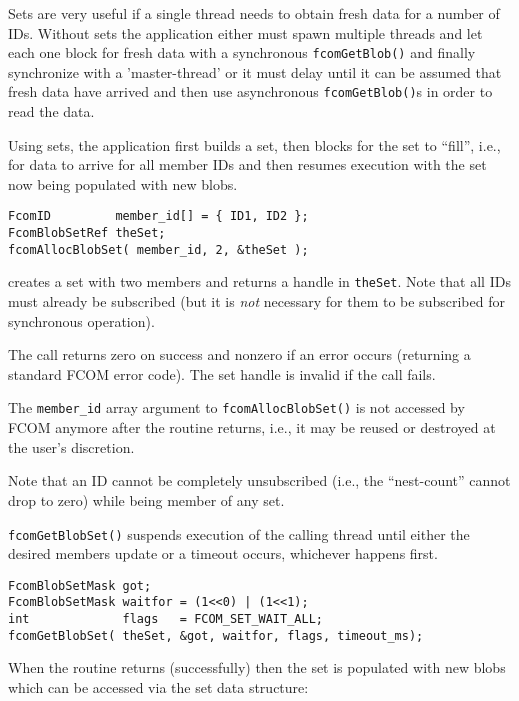 \documentclass[11pt]{article}
\newcommand{\fcom}{FCOM}
\newcommand{\blob}{blob}
\newcommand{\set}{set}
\newcommand{\Set}{Set}
\newcommand{\cstl}[1]{{\lstinline+#1+}}
\begin{document}
      \Set{}s are very useful if a single thread needs to obtain fresh
      data for a number of IDs. Without \set{}s the application either must
      spawn multiple threads and let each one block for fresh data
      with a synchronous \cstl{fcomGetBlob()} and finally synchronize
      with a 'master-thread' or it must delay until it can be assumed
      that fresh data have arrived and then use asynchronous \cstl{fcomGetBlob()}s
      in order to read the data.

      Using \set{}s, the application first builds a \set, then blocks
      for the \set{} to ``fill'', i.e., for data to arrive for all member IDs
      and then resumes execution with the \set{} now being populated with
      new \blob{}s.

      \begin{verbatim}
FcomID         member_id[] = { ID1, ID2 };
FcomBlobSetRef theSet;
fcomAllocBlobSet( member_id, 2, &theSet );
      \end{verbatim}
      creates a \set{} with two members and returns a handle in \cstl{theSet}.
      Note that all IDs must already be subscribed (but it is {\em not} necessary for
      them to be subscribed for synchronous operation).

      The call returns zero on success and nonzero if an error occurs (returning
      a standard \fcom{} error code). The \set{} handle is invalid if the call
      fails.

      The \cstl{member_id} array argument to \cstl{fcomAllocBlobSet()} is
      not accessed by \fcom{} anymore after the routine returns, i.e., it may
      be reused or destroyed at the user's discretion.

      Note that an ID cannot be completely unsubscribed (i.e., the ``nest-count''
      cannot drop to zero) while being member of any \set.

      \cstl{fcomGetBlobSet()} suspends execution of the calling thread until
      either the desired members update or a timeout occurs, whichever happens
      first.

      \begin{verbatim}
FcomBlobSetMask got;
FcomBlobSetMask waitfor = (1<<0) | (1<<1);
int             flags   = FCOM_SET_WAIT_ALL;
fcomGetBlobSet( theSet, &got, waitfor, flags, timeout_ms);
      \end{verbatim}

      When the routine returns (successfully) then the \set{} is populated with new \blob{}s
      which can be accessed via the \set{} data structure:
\end{document}
